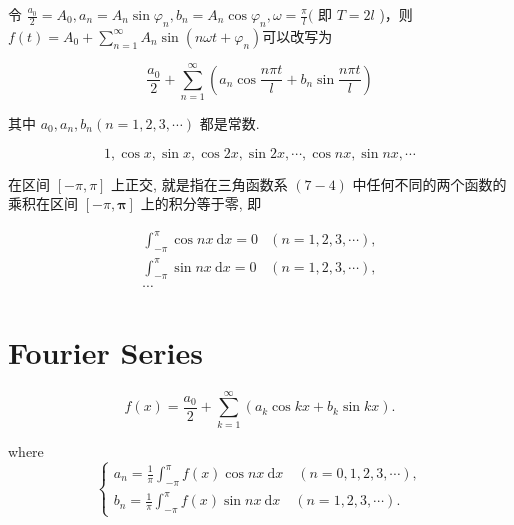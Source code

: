 \begin{definition}[三角级数]
    令 $ \frac{a_{0}}{2}=A_{0}, a_{n}=A_{n} \sin \varphi_{n}, b_{n}=A_{n} \cos \varphi_{n}, \omega=\frac{\pi}{l}( $ 即 $ T=2 l $ )，则$ f(t)=A_{0}+\sum_{n=1}^{\infty} A_{n} \sin \left(n \omega t+\varphi_{n}\right) $可以改写为

    $$ \frac{a_{0}}{2}+\sum_{n=1}^{\infty}\left(a_{n} \cos \frac{n \pi t}{l}+b_{n} \sin \frac{n \pi t}{l}\right) $$

    其中 $ a_{0}, a_{n}, b_{n}(n=1,2,3, \cdots) $ 都是常数. 
\end{definition}

\begin{definition}[三角函数系]
    $$ 1, \cos x, \sin x, \cos 2 x, \sin 2 x, \cdots, \cos n x, \sin n x, \cdots $$

    在区间 $ [-\pi, \pi] $ 上正交, 就是指在三角函数系 $ (7-4) $ 中任何不同的两个函数的 乘积在区间 $ [-\pi, \boldsymbol{\pi}] $ 上的积分等于零, 即

    $$ \begin{array}{ll}\int_{-\pi}^{\pi} \cos n x \mathrm{~d} x=0 & (n=1,2,3, \cdots), \\ \int_{-\pi}^{\pi} \sin n x \mathrm{~d} x=0 & (n=1,2,3, \cdots),\\ \cdots
    \end{array} $$
\end{definition}

\section{Fourier Series}

\begin{definition}[傅里叶级数]
    $$
f(x)=\frac{a_{0}}{2}+\sum_{k=1}^{\infty}\left(a_{k} \cos k x+b_{k} \sin k x\right) .
$$

where $$ \left\{\begin{array}{l}a_{n}=\frac{1}{\pi} \int_{-\pi}^{\pi} f(x) \cos n x \mathrm{~d} x \quad(n=0,1,2,3, \cdots), \\ b_{n}=\frac{1}{\pi} \int_{-\pi}^{\pi} f(x) \sin n x \mathrm{~d} x \quad(n=1,2,3, \cdots) .\end{array}\right. $$
\end{definition}


